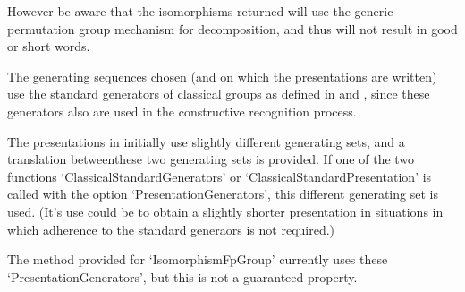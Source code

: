 However be aware that the isomorphisms returned will use the generic
permutation group mechanism for decomposition, and thus will not result in
good or short words.


The generating sequences chosen (and on which the presentations are written)
use the standard generators of classical groups as defined in
\cite{LGO09} and \cite{DLLGO13}, since these generators also are used in the
constructive recognition process.

The presentations in \cite{LGO20} initially use slightly different generating
sets, and a translation betweenthese two generating sets is provided. If one
of the two functions `ClassicalStandardGenerators' or
`ClassicalStandardPresentation' is called with the option
`PresentationGenerators', this different generating set is used. (It's use
could be to obtain a slightly shorter presentation in situations in which
adherence to the standard generaors is not required.)

The method provided for `IsomorphismFpGroup' currently uses these
`PresentationGenerators', but this is not a guaranteed property.


